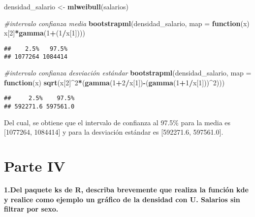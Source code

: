 \documentclass[
]{article}
\newenvironment{Shaded}{\begin{snugshade}}{\end{snugshade}}
\newcommand{\AttributeTok}[1]{\textcolor[rgb]{0.13,0.29,0.53}{#1}}
\newcommand{\CommentTok}[1]{\textcolor[rgb]{0.56,0.35,0.01}{\textit{#1}}}
\newcommand{\ControlFlowTok}[1]{\textcolor[rgb]{0.13,0.29,0.53}{\textbf{#1}}}
\newcommand{\DecValTok}[1]{\textcolor[rgb]{0.00,0.00,0.81}{#1}}
\newcommand{\FunctionTok}[1]{\textcolor[rgb]{0.13,0.29,0.53}{\textbf{#1}}}
\newcommand{\NormalTok}[1]{#1}
\newcommand{\OtherTok}[1]{\textcolor[rgb]{0.56,0.35,0.01}{#1}}
\newcommand{\SpecialCharTok}[1]{\textcolor[rgb]{0.81,0.36,0.00}{\textbf{#1}}}
\begin{document}
\begin{Shaded}
\begin{Highlighting}[]
\NormalTok{densidad\_salario }\OtherTok{\textless{}{-}} \FunctionTok{mlweibull}\NormalTok{(salarios)}

\CommentTok{\#intervalo confianza media}
\FunctionTok{bootstrapml}\NormalTok{(densidad\_salario, }\AttributeTok{map =} \ControlFlowTok{function}\NormalTok{(x) x[}\DecValTok{2}\NormalTok{]}\SpecialCharTok{*}\FunctionTok{gamma}\NormalTok{(}\DecValTok{1}\SpecialCharTok{+}\NormalTok{(}\DecValTok{1}\SpecialCharTok{/}\NormalTok{x[}\DecValTok{1}\NormalTok{])))}
\end{Highlighting}
\end{Shaded}

\begin{verbatim}
##    2.5%   97.5% 
## 1077264 1084414
\end{verbatim}

\begin{Shaded}
\begin{Highlighting}[]
\CommentTok{\#intervalo confianza desviación estándar}
\FunctionTok{bootstrapml}\NormalTok{(densidad\_salario, }\AttributeTok{map =} \ControlFlowTok{function}\NormalTok{(x) }\FunctionTok{sqrt}\NormalTok{(x[}\DecValTok{2}\NormalTok{]}\SpecialCharTok{\^{}}\DecValTok{2}\SpecialCharTok{*}\NormalTok{(}\FunctionTok{gamma}\NormalTok{(}\DecValTok{1}\SpecialCharTok{+}\DecValTok{2}\SpecialCharTok{/}\NormalTok{x[}\DecValTok{1}\NormalTok{])}\SpecialCharTok{{-}}\NormalTok{(}\FunctionTok{gamma}\NormalTok{(}\DecValTok{1}\SpecialCharTok{+}\DecValTok{1}\SpecialCharTok{/}\NormalTok{x[}\DecValTok{1}\NormalTok{]))}\SpecialCharTok{\^{}}\DecValTok{2}\NormalTok{)))}
\end{Highlighting}
\end{Shaded}

\begin{verbatim}
##     2.5%    97.5% 
## 592271.6 597561.0
\end{verbatim}

Del cual, se obtiene que el intervalo de confianza al 97.5\% para la
media es {[}1077264, 1084414{]} y para la desviación estándar es
{[}592271.6, 597561.0{]}.

\hypertarget{parte-iv}{%
\section{Parte IV}\label{parte-iv}}

\textbf{1.Del paquete ks de R, describa brevemente que realiza la
función kde y realice como ejemplo un gráfico de la densidad con U.
Salarios sin filtrar por sexo.}
\end{document}
